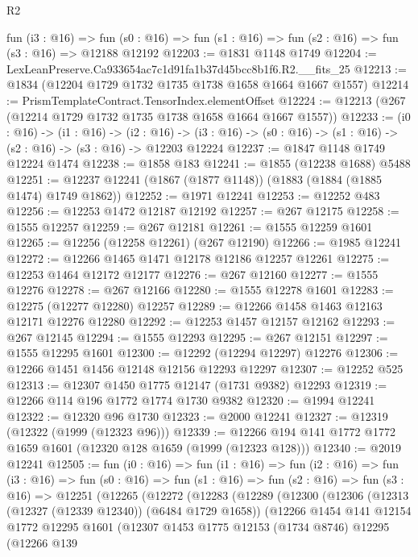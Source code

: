 \begin{lexlean}{R2}
\begin{coremodule}
  fun (i3 : @16) =>
  fun (s0 : @16) => fun (s1 : @16) => fun (s2 : @16) => fun (s3 : @16) => @12188 @12192
@12203 := @1831 @1148 @1749
@12204 := LexLeanPreserve.Ca933654ac7c1d91fa1b37d45bcc8b1f6.R2.__fits_25
@12213 := @1834 (@12204 @1729 @1732 @1735 @1738 @1658 @1664 @1667 @1557)
@12214 := PrismTemplateContract.TensorIndex.elementOffset
@12224 := @12213 (@267 (@12214 @1729 @1732 @1735 @1738 @1658 @1664 @1667 @1557))
@12233 := (i0 : @16) ->
  (i1 : @16) ->
  (i2 : @16) -> (i3 : @16) -> (s0 : @16) -> (s1 : @16) -> (s2 : @16) -> (s3 : @16) -> @12203 @12224
@12237 := @1847 @1148 @1749 @12224 @1474
@12238 := @1858 @183
@12241 := @1855 (@12238 @1688) @5488
@12251 := @12237 @12241 (@1867 (@1877 @1148)) (@1883 (@1884 (@1885 @1474) @1749 @1862))
@12252 := @1971 @12241
@12253 := @12252 @483
@12256 := @12253 @1472 @12187 @12192
@12257 := @267 @12175
@12258 := @1555 @12257
@12259 := @267 @12181
@12261 := @1555 @12259 @1601
@12265 := @12256 (@12258 @12261) (@267 @12190)
@12266 := @1985 @12241
@12272 := @12266 @1465 @1471 @12178 @12186 @12257 @12261
@12275 := @12253 @1464 @12172 @12177
@12276 := @267 @12160
@12277 := @1555 @12276
@12278 := @267 @12166
@12280 := @1555 @12278 @1601
@12283 := @12275 (@12277 @12280) @12257
@12289 := @12266 @1458 @1463 @12163 @12171 @12276 @12280
@12292 := @12253 @1457 @12157 @12162
@12293 := @267 @12145
@12294 := @1555 @12293
@12295 := @267 @12151
@12297 := @1555 @12295 @1601
@12300 := @12292 (@12294 @12297) @12276
@12306 := @12266 @1451 @1456 @12148 @12156 @12293 @12297
@12307 := @12252 @525
@12313 := @12307 @1450 @1775 @12147 (@1731 @9382) @12293
@12319 := @12266 @114 @196 @1772 @1774 @1730 @9382
@12320 := @1994 @12241
@12322 := @12320 @96 @1730
@12323 := @2000 @12241
@12327 := @12319 (@12322 (@1999 (@12323 @96)))
@12339 := @12266 @194 @141 @1772 @1772 @1659 @1601 (@12320 @128 @1659 (@1999 (@12323 @128)))
@12340 := @2019 @12241
@12505 := fun (i0 : @16) =>
  fun (i1 : @16) =>
  fun (i2 : @16) =>
  fun (i3 : @16) =>
  fun (s0 : @16) =>
  fun (s1 : @16) =>
  fun (s2 : @16) =>
  fun (s3 : @16) =>
  @12251
    (@12265
      (@12272
        (@12283
          (@12289
            (@12300
              (@12306
                (@12313 (@12327 (@12339 @12340)) (@6484 @1729 @1658))
                (@12266
                  @1454
                  @141
                  @12154
                  @1772
                  @12295
                  @1601
                  (@12307
                    @1453
                    @1775
                    @12153
                    (@1734 @8746)
                    @12295
                    (@12266
                      @139

\end{coremodule}
\end{lexlean}
